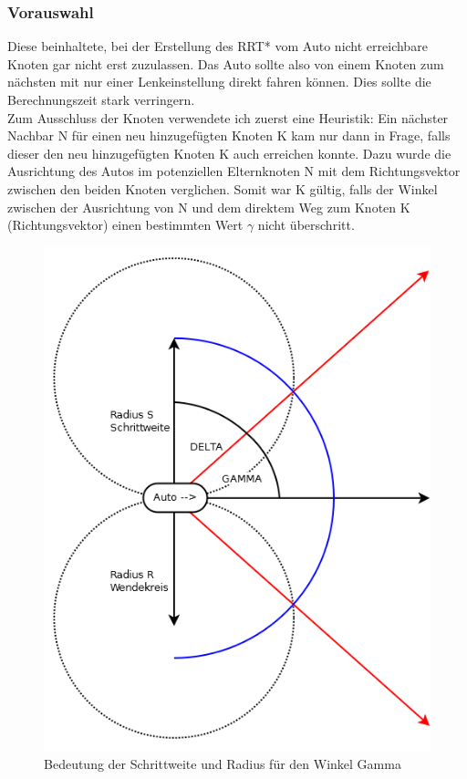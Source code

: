 \subsubsection{Vorauswahl}
\label{sec:Vorauswahl}
Diese beinhaltete, bei der Erstellung des RRT* vom Auto nicht erreichbare Knoten gar nicht erst zuzulassen. Das Auto sollte also von einem Knoten zum nächsten mit nur einer Lenkeinstellung direkt fahren können. Dies sollte die Berechnungszeit stark verringern. \\
Zum Ausschluss der Knoten verwendete ich zuerst eine Heuristik: Ein nächster Nachbar N für einen neu hinzugefügten Knoten K kam nur dann in Frage, falls dieser den neu hinzugefügten Knoten K auch erreichen konnte. Dazu wurde die Ausrichtung des Autos im potenziellen Elternknoten N mit dem Richtungsvektor zwischen den beiden Knoten verglichen. Somit war K gültig, falls der Winkel zwischen der Ausrichtung von N und dem direktem Weg zum Knoten K (Richtungsvektor) einen bestimmten Wert $\gamma$ nicht überschritt.
\begin{figure}
\centering
\label{fig:fig4}
\includegraphics[scale=0.6]{Bilder/AusrichtungGrob.png} 
\caption{Bedeutung der Schrittweite und Radius für den Winkel Gamma}
\end{figure}
